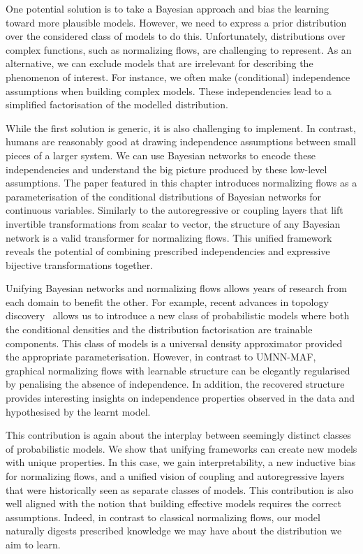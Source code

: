 One potential solution is to take a Bayesian approach and bias the learning toward more plausible models. However, we need to express a prior distribution over the considered class of models to do this. Unfortunately, distributions over complex functions, such as normalizing flows, are challenging to represent. As an alternative, we can exclude models that are irrelevant for describing the phenomenon of interest. For instance, we often make (conditional) independence assumptions when building complex models. These independencies lead to a simplified factorisation of the modelled distribution.

While the first solution is generic, it is also challenging to implement. In contrast, humans are reasonably good at drawing independence assumptions between small pieces of a larger system. We can use Bayesian networks to encode these independencies and understand the big picture produced by these low-level assumptions. The paper featured in this chapter introduces normalizing flows as a parameterisation of the conditional distributions of Bayesian networks for continuous variables. Similarly to the autoregressive or coupling layers that lift invertible transformations from scalar to vector, the structure of any Bayesian network is a valid transformer for normalizing flows. This unified framework reveals the potential of combining prescribed independencies and expressive bijective transformations together.

Unifying Bayesian networks and normalizing flows allows years of research from each domain to benefit the other. For example, recent advances in topology discovery~\citep{zheng2018dags} allows us to introduce a new class of probabilistic models where both the conditional densities and the distribution factorisation are trainable components. This class of models is a universal density approximator provided the appropriate parameterisation. However, in contrast to UMNN-MAF, graphical normalizing flows with learnable structure can be elegantly regularised by penalising the absence of independence. In addition, the recovered structure provides interesting insights on independence properties observed in the data and hypothesised by the learnt model.

This contribution is again about the interplay between seemingly distinct classes of probabilistic models. We show that unifying frameworks can create new models with unique properties. In this case, we gain interpretability, a new inductive bias for normalizing flows, and a unified vision of coupling and autoregressive layers that were historically seen as separate classes of models. This contribution is also well aligned with the notion that building effective models requires the correct assumptions. Indeed, in contrast to classical normalizing flows, our model naturally digests prescribed knowledge we may have about the distribution we aim to learn.



